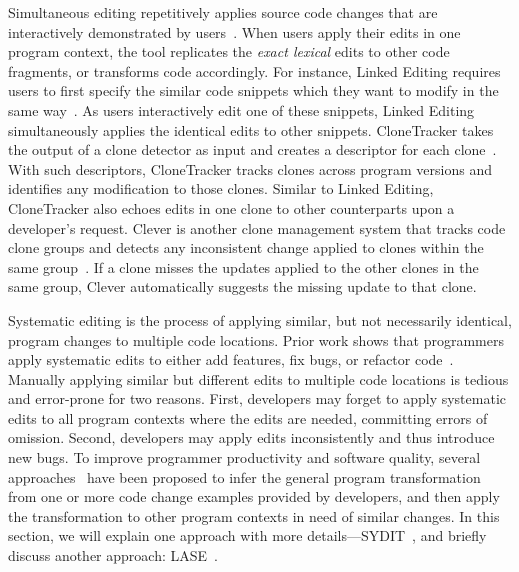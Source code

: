 \documentclass[runningheads,a4paper]{llncs}
\begin{document}
Simultaneous editing repetitively applies source code changes that are interactively demonstrated by users~\cite{MiM2001}. When users apply their edits in one program context, the tool replicates the \emph{exact lexical} edits to other code fragments, or transforms code accordingly. For instance, Linked Editing requires users to first specify the similar code snippets which they want to modify in the same way~\cite{TBG2004}. As users interactively edit one of these snippets, Linked Editing simultaneously applies the identical edits to other snippets. 
CloneTracker takes the output of a clone detector as input and creates a descriptor for each clone~\cite{DuR2007}. With such descriptors, CloneTracker tracks clones across program versions and identifies any modification to those clones. 
Similar to Linked Editing, CloneTracker also echoes edits in one clone to other counterparts upon a developer's request. 
Clever is another clone management system that tracks code clone groups and detects any inconsistent change applied to clones within the same group~\cite{NNP2009}. If a clone misses the updates applied to the other clones in the same group, Clever automatically suggests the missing update to that clone.



Systematic editing is the process of applying similar, but not necessarily identical, program changes to multiple code locations. Prior work shows that programmers apply systematic edits to either add features, fix bugs, or refactor code~\cite{Kim:2005,Kim:2009,Nguyen:2010}. Manually applying similar but different edits to multiple code locations is tedious and error-prone for two reasons. First, developers may forget to apply systematic edits to all program contexts where the edits are needed, committing errors of omission. Second, developers may apply edits inconsistently and thus introduce new bugs. To improve programmer productivity and software quality, several approaches~\cite{MKM2011,MKM2013,Rolim:2017} have been proposed to infer the general program transformation from one or more code change examples provided by developers, and then apply the transformation to other program contexts in need of similar changes. In this section, we will explain one approach with more details---SYDIT~\cite{MKM2011}, and briefly discuss another approach: LASE~\cite{MKM2013}.
\end{document}
